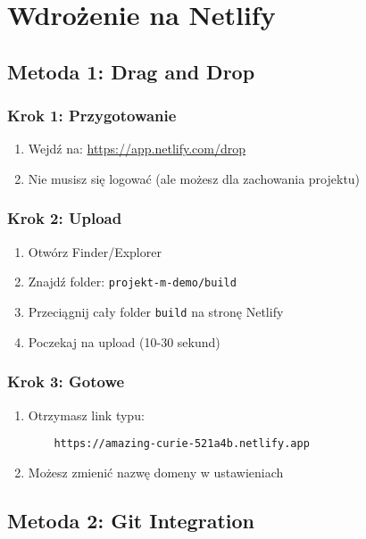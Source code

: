 \documentclass[12pt,a4paper]{article}
\begin{document}
\newpage
\section{Wdrożenie na Netlify}

\subsection{Metoda 1: Drag and Drop}

\subsubsection{Krok 1: Przygotowanie}
\begin{enumerate}
    \item Wejdź na: \url{https://app.netlify.com/drop}
    \item Nie musisz się logować (ale możesz dla zachowania projektu)
\end{enumerate}

\subsubsection{Krok 2: Upload}
\begin{enumerate}
    \item Otwórz Finder/Explorer
    \item Znajdź folder: \texttt{projekt-m-demo/build}
    \item Przeciągnij cały folder \texttt{build} na stronę Netlify
    \item Poczekaj na upload (10-30 sekund)
\end{enumerate}

\subsubsection{Krok 3: Gotowe}
\begin{enumerate}
    \item Otrzymasz link typu:
    \begin{verbatim}
    https://amazing-curie-521a4b.netlify.app
    \end{verbatim}
    \item Możesz zmienić nazwę domeny w ustawieniach
\end{enumerate}

\subsection{Metoda 2: Git Integration}
\end{document}
